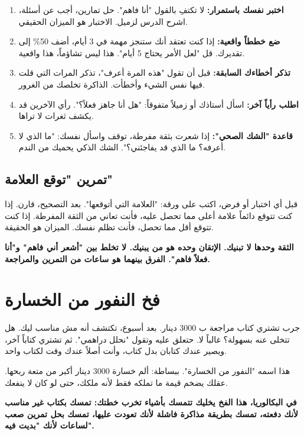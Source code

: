 \documentclass[12pt,a4paper]{book}
\newcommand{\importantAr}[1]{%
	\begin{important}
		\bfseries #1
	\end{important}
}
\begin{document}
\begin{enumerate}
	\item \textbf{اختبر نفسك باستمرار:} لا تكتفِ بالقول "أنا فاهم". حل تمارين، أجب عن أسئلة، اشرح الدرس لزميل. الاختبار هو الميزان الحقيقي.
	
	\item \textbf{ضع خططاً واقعية:} إذا كنت تعتقد أنك ستنجز مهمة في 3 أيام، أضف 50\% إلى تقديرك. قل "لعل الأمر يحتاج 5 أيام". هذا ليس تشاؤماً، هذا واقعية.
	
	\item \textbf{تذكر أخطاءك السابقة:} قبل أن تقول "هذه المرة أعرف"، تذكر المرات التي قلت فيها نفس الشيء وأخطأت. الذاكرة تخلصك من الغرور.
	
	\item \textbf{اطلب رأياً آخر:} اسأل أستاذك أو زميلاً متفوقاً: "هل أنا جاهز فعلاً؟". رأي الآخرين قد يكشف ثغرات لا تراها.
	
	\item \textbf{قاعدة "الشك الصحي":} إذا شعرت بثقة مفرطة، توقف واسأل نفسك: "ما الذي لا أعرفه؟ ما الذي قد يفاجئني؟". الشك الذكي يحميك من الندم.
\end{enumerate}

\subsection{تمرين "توقع العلامة"}

قبل أي اختبار أو فرض، اكتب على ورقة: "العلامة التي أتوقعها". بعد التصحيح، قارن. إذا كنت تتوقع دائماً علامة أعلى مما تحصل عليه، فأنت تعاني من الثقة المفرطة. إذا كنت تتوقع أقل مما تحصل، فأنت تظلم نفسك. الميزان هو الحقيقة.

\importantAr{الثقة وحدها لا تبنيك. الإتقان وحده هو من يبنيك. لا تخلط بين "أشعر أني فاهم" و"أنا فعلاً فاهم". الفرق بينهما هو ساعات من التمرين والمراجعة.}

\section{فخ النفور من الخسارة}
\label{sec:loss-aversion}

جرب تشتري كتاب مراجعة ب 3000 دينار. بعد أسبوع، تكتشف أنه مش مناسب ليك. هل تتخلى عنه بسهولة؟ غالباً لا. حتعلق عليه وتقول "نحلل دراهمي". ثم تشتري كتاباً آخر، ويصير عندك كتابان بدل كتاب، وأنت أصلاً عندك وقت لكتاب واحد.

هذا اسمه "النفور من الخسارة". ببساطة: ألم خسارة 3000 دينار أكبر من متعة ربحها. عقلك يضخم قيمة ما تملكه فقط لأنه ملكك، حتى لو كان لا ينفعك.

\importantAr{في البكالوريا، هذا الفخ يخليك تتمسك بأشياء تخرب خطتك: تمسك بكتاب غير مناسب لأنك دفعته، تمسك بطريقة مذاكرة فاشلة لأنك تعودت عليها، تمسك بحل تمرين صعب لساعات لأنك "بديت فيه".}
\end{document}
